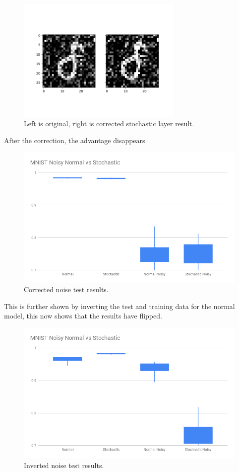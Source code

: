 \documentclass[a4paper,twoside,phd]{BYUPhys}
\begin{document}
\begin{figure}[H]
\centering
\includegraphics[width=8cm]{results/stochastic_layer_pass_corrected.png}
\caption{Left is original, right is corrected stochastic layer result.}
\label{fig:stochastic}
\end{figure}

After the correction, the advantage disappears.
\begin{figure}[H]
\centering
\includegraphics[width=12cm]{results/bitsize_corrected.png}
\caption{Corrected noise test results.}
\label{fig:bitsize}
\end{figure}

This is further shown by inverting the test and training data for the normal model, this now shows that the results have flipped.
\begin{figure}[H]
\centering
\includegraphics[width=12cm]{results/normal_inverted.png}
\caption{Inverted noise test results.}
\label{fig:normal_inverted}
\end{figure}
\end{document}
